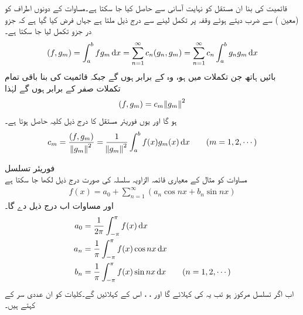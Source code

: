 قائمیت کی بنا ان مستقل کو نہایت آسانی سے حاصل کیا جا سکتا ہے۔مساوات  کے دونوں اطراف کو  (معین  ) سے ضرب دیتے ہوئے وقفہ  پر تکمل لینے سے درج ذیل ملتا ہے جہاں فرض کیا گیا ہے کہ جزو در جزو تکمل لیا جا سکتا ہے۔ 
\begin{align*}
(f,g_m)=\int_{a}^{b}fg_m\dif x=\sum_{n=1}^{\infty} c_n(g_n,g_m)=\sum_{n=1}^{\infty} c_n\int_{a}^{b} g_n g_m \dif x
\end{align*}
بائیں ہاتھ جن تکملات میں  ہو، وہ   کے برابر ہوں گے جبکہ قائمیت کی بنا  باقی تمام تکملات صفر کے برابر ہوں گے لہٰذا
\begin{align}\label{مساوات_طاقتی_اضافی_فوریئر_عمومی_ب}
(f,g_m)=c_m\norm{g_m}^2
\end{align}
ہو گا اور یوں فوریئر مستقل کا درج ذیل کلیہ حاصل ہوتا ہے۔
\begin{align}\label{مساوات_طاقتی_اضافی_فوریئر_عمومی_پ}
c_m=\frac{(f,g_m)}{\norm{g_m}^2}=\frac{1}{\norm{g_m}^2}\int_{a}^{b} f(x)g_m(x)\dif x \quad \quad (m=1,2,\cdots)
\end{align}

\quad فوریئر تسلسل\\
مساوات  کو مثال  کے معیاری قائمہ الزاویہ سلسلہ کی صورت درج ذیل لکھا جا سکتا ہے
\begin{align}\label{مساوات_طاقتی_اضافی_فوریئر_عمومی_ت}
f(x)=a_0+\sum_{n=1}^{\infty}(a_n\cos nx+b_n\sin nx)
\end{align}
اور مساوات  اب درج ذیل دے گا۔
\begin{gather}
\begin{aligned}\label{مساوات_طاقتی_اضافی_فوریئر_عمومی_ٹ}
a_0&=\frac{1}{2\pi}\int_{-\pi}^{\pi} f(x)\dif x\\
a_n&=\frac{1}{\pi}\int_{-\pi}^{\pi} f(x)\cos nx \dif x\\
b_n&=\frac{1}{\pi}\int_{-\pi}^{\pi}f(x)\sin nx \dif x\quad \quad (n=1,2,\cdots)
\end{aligned}
\end{gather} 
اب اگر تسلسل  مرکوز ہو تب یہ  کی  کہلائے گا اور ، ،  اس کے  کہلائیں گے۔کلیات  کو ان عددی سر کے  کہتے ہیں۔

